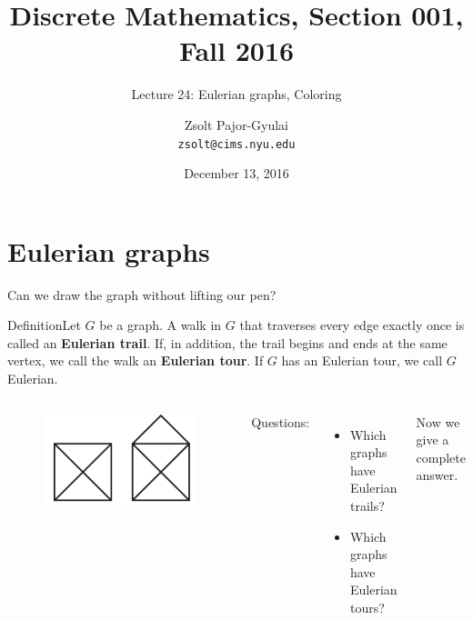 \documentclass{beamer}
\title{Discrete Mathematics, Section 001, Fall 2016}
\subtitle{Lecture 24: Eulerian graphs, Coloring}
\date{December 13, 2016}
\author[Zsolt]{Zsolt Pajor-Gyulai \\ \texttt{zsolt@cims.nyu.edu}}
\institute[NYU] 
{
\normalsize Courant Institute of Mathematical Sciences
}
\def\bl[#1]#2{\begin{block}{#1}#2\end{block}}
\def\itemb{\begin{itemize}}
\def\iteme{\end{itemize}}
\begin{document}
\begin{frame}
  \titlepage
\end{frame}


\section{Eulerian graphs}

\begin{frame}{Can we draw the graph without lifting our pen?}
\bl[Definition]{Let $G$ be a graph. A walk in $G$ that traverses every edge exactly once is called an \textbf{Eulerian trail}. If, in addition, the trail begins and ends at the same vertex, we call the walk an \textbf{Eulerian tour}. If $G$ has an Eulerian tour, we call $G$ Eulerian.}
\begin{columns}
\begin{figure}
\centering
\includegraphics[scale=0.25]{LittleHouse.pdf}
\end{figure}

Questions:
\itemb
\item Which graphs have Eulerian trails?
\item Which graphs have Eulerian tours?
\iteme
Now we give a complete answer.

\end{columns}
\end{frame}
\end{document}
